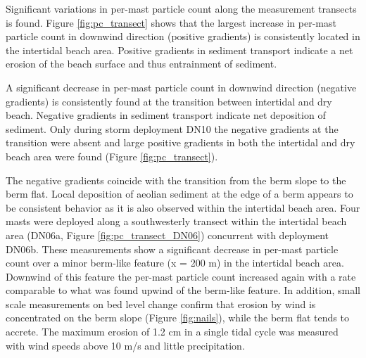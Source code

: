 Significant variations in per-mast particle count along the
measurement transects is found. Figure \ref{fig:pc_transect} shows
that the largest increase in per-mast particle count in downwind
direction (positive gradients) is consistently located in the
intertidal beach area. Positive gradients in sediment transport
indicate a net erosion of the beach surface and thus entrainment of
sediment.

A significant decrease in per-mast particle count in downwind
direction (negative gradients) is consistently found at the transition
between intertidal and dry beach. Negative gradients in sediment
transport indicate net deposition of sediment. Only during storm
deployment DN10 the negative gradients at the transition were absent
and large positive gradients in both the intertidal and dry beach area
were found (Figure \ref{fig:pc_transect}).

The negative gradients coincide with the transition from the berm
slope to the berm flat. Local deposition of aeolian sediment at the
edge of a berm appears to be consistent behavior as it is also
observed within the intertidal beach area. Four masts were deployed
along a southwesterly transect within the intertidal beach area
(DN06a, Figure \ref{fig:pc_transect_DN06}) concurrent with deployment
DN06b. These measurements show a significant decrease in per-mast
particle count over a minor berm-like feature (x = 200 m) in the
intertidal beach area. Downwind of this feature the per-mast particle
count increased again with a rate comparable to what was found upwind
of the berm-like feature. In addition, small scale measurements on bed
level change confirm that erosion by wind is concentrated on the berm
slope (Figure \ref{fig:nails}), while the berm flat tends to
accrete. The maximum erosion of 1.2 cm in a single tidal cycle was
measured with wind speeds above 10 m/s and little precipitation.

